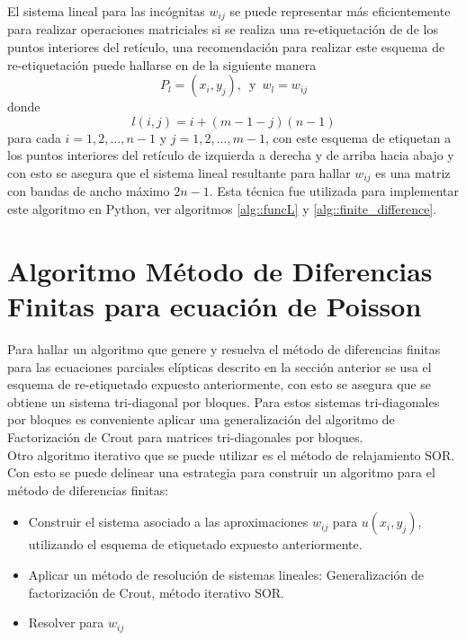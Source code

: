 \documentclass[a4paper]{article}
\begin{document}
El sistema lineal para las incógnitas $w_{ij}$ se puede representar más eficientemente para realizar operaciones matriciales si se realiza una re-etiquetación de de los puntos interiores del retículo, una recomendación para realizar este esquema de re-etiquetación puede hallarse en \cite{Varga} de la siguiente manera
\begin{equation}
P_l=(x_i,y_j), \,\,\, \text{y}\,\,\, w_l=w_{ij}
\end{equation}
donde
\begin{equation}\label{eq::relabeling_function}
l(i,j)=i+(m-1-j)(n-1)
\end{equation} 
para cada $i=1,2,\hdots,n-1$ y $j=1,2,\hdots,m-1$, con este esquema de etiquetan a los puntos interiores del retículo de izquierda a derecha y de arriba hacia abajo y con esto se asegura que el sistema lineal resultante para hallar $w_{ij}$ es una matriz con bandas de ancho máximo $2n-1$. Esta técnica fue utilizada para implementar este algoritmo en Python, ver algoritmos \ref{alg::funcL} y \ref{alg::finite_difference}.



\section{Algoritmo Método de Diferencias Finitas para ecuación de Poisson}
Para hallar un algoritmo que genere y resuelva el método de diferencias finitas para las ecuaciones parciales elípticas descrito en la sección anterior se usa el esquema de re-etiquetado expuesto anteriormente, con esto se asegura que se obtiene un sistema tri-diagonal por bloques. Para estos sistemas tri-diagonales por bloques es conveniente aplicar una generalización del algoritmo de Factorización de Crout \cite{Varga} para matrices tri-diagonales por bloques.\\
Otro algoritmo iterativo que se puede utilizar es el método de relajamiento SOR. Con esto se puede delinear una estrategia para construir un algoritmo para el método de diferencias finitas:
\begin{itemize}
\item Construir el sistema asociado a las aproximaciones $w_{ij}$ para $u(x_i,y_j)$, utilizando el esquema de etiquetado expuesto anteriormente.
\item Aplicar un método de resolución de sistemas lineales: Generalización de factorización de Crout, método iterativo SOR.
\item Resolver para $w_{ij}$
\end{itemize}
\end{document}
